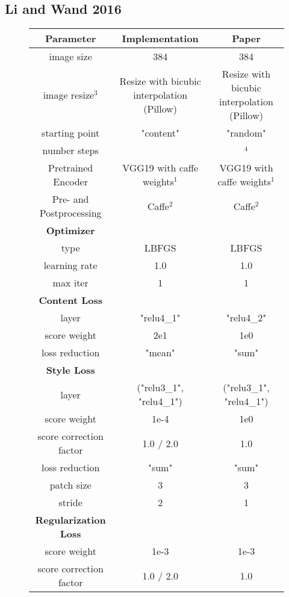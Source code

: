 \subsection{Li and Wand 2016}
\begin{figure}[H]
	\vspace{17cm}
	\begin{center}
		\begin{rotate}{90}
			\footnotesize
			\centering	
		\begin{tabular}{c|c|c}
			\hline
			\bfseries Parameter & \bfseries Implementation & \bfseries Paper\\
			\hline\hline
			image size & 384 & 384 \\
			image resize$^3$ & Resize with bicubic interpolation (Pillow) & Resize with bicubic interpolation (Pillow)\\
			starting point & "content"  & "random" \\
			number steps &  & $^4$ \\
			Pretrained Encoder & VGG19 with caffe weights$^1$ & VGG19 with caffe weights$^1$ \\
			Pre- and Postprocessing & Caffe$^2$ & Caffe$^2$\\
			\hline
			\bfseries Optimizer & &\\
			\hline
			type & LBFGS & LBFGS \\
			learning rate & 1.0 & 1.0 \\
			max iter & 1 & 1 \\
			\hline
			\bfseries  Content Loss & & \\
			\hline
			layer & "relu4\_1" & "relu4\_2" \\
			score weight & 2e1 & 1e0 \\
			loss reduction & "mean" & "sum" \\
			\hline
			\bfseries  Style Loss & & \\
			\hline
			layer & ("relu3\_1", "relu4\_1") & ("relu3\_1", "relu4\_1") \\
			score weight & 1e-4 & 1e0 \\
			score correction factor & 1.0 / 2.0 & 1.0 \\
			loss reduction & "sum" & "sum" \\
			patch size & 3 & 3\\
			stride & 2 & 1\\
			\hline
			\bfseries  Regularization Loss & & \\
			\hline
			score weight & 1e-3 & 1e-3 \\
			score correction factor & 1.0 / 2.0 & 1.0 \\

\end{tabular}
\end{rotate}
\end{center}
\end{figure}
